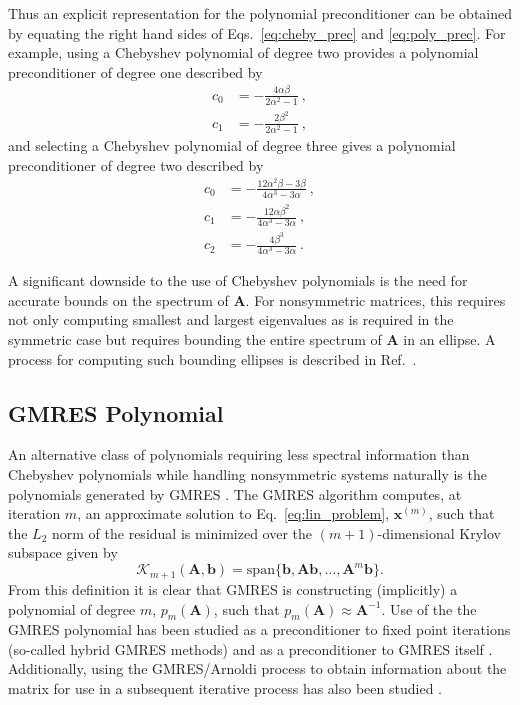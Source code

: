 \documentclass[10pt]{article}
\newcommand{\bx}{\ensuremath{\mathbf{x}}}
\newcommand{\bb}{\ensuremath{\mathbf{b}}}
\newcommand{\bA}{\ensuremath{\mathbf{A}}}
\newcommand{\calK}{\ensuremath{\mathcal{K}}}
\begin{document}
Thus an explicit representation for the polynomial preconditioner can
be obtained by equating the right hand sides of Eqs.~\eqref{eq:cheby_prec}
and \eqref{eq:poly_prec}.  For example, using a Chebyshev polynomial of
degree two provides a polynomial preconditioner of degree one described by
\begin{equation}
\begin{aligned}
c_0 &= - \frac{4 \alpha \beta}{2 \alpha^2 -1} \:, \\
c_1 &= - \frac{2 \beta^2}{2 \alpha^2 - 1} \:,
\end{aligned}
\end{equation}
and selecting a Chebyshev polynomial of degree three gives a polynomial
preconditioner of degree two described by
\begin{equation}
\begin{aligned}
c_0 &= - \frac{12 \alpha^2 \beta - 3 \beta}{4 \alpha^3 - 3 \alpha} \:, \\
c_1 &= - \frac{12 \alpha \beta^2}{4 \alpha^3 - 3 \alpha} \:, \\
c_2 &= - \frac{4 \beta^3}{4 \alpha^3 - 3 \alpha} \:.
\end{aligned}
\end{equation}

A significant downside to the use of Chebyshev polynomials is the need for
accurate bounds on the spectrum of $\bA$.  For nonsymmetric matrices,
this requires not only computing smallest and largest eigenvalues as is
required in the symmetric case but requires
bounding the entire spectrum of $\bA$ in an ellipse.  A process for
computing such bounding ellipses is described in Ref.~\cite{manteuffel_77}.

\subsection{GMRES Polynomial}
\label{subsec:gmres_poly}

An alternative class of polynomials requiring less spectral information
than Chebyshev polynomials
while handling nonsymmetric systems naturally is the polynomials generated
by GMRES \cite{saad_86}.  The GMRES algorithm computes, at iteration $m$,
an approximate solution to Eq.~\eqref{eq:lin_problem}, $\bx^{(m)}$,
such that the $L_2$ norm of the residual
is minimized over the $(m+1)$-dimensional Krylov subspace given by
\begin{equation}
\calK_{m+1}(\bA,\bb) = \text{span}\{ \bb, \bA \bb, \ldots, \bA^{m} \bb \}.
\end{equation}
From this definition it is clear that GMRES is constructing (implicitly)
a polynomial of degree $m$, $p_m(\bA)$, such that $p_m(\bA) \approx \bA^{-1}$.
Use of the the GMRES polynomial has been studied as a preconditioner
to fixed point iterations (so-called hybrid GMRES methods)
\cite{elman_86,nachtigal_92,joubert_94}
and as a preconditioner to {GMRES} itself \cite{liu_14}.
Additionally, using the GMRES/Arnoldi process to obtain information about
the matrix for use in a subsequent iterative process has also been
studied \cite{elman_86_2,saylor_90,saylor_91}.
\end{document}
